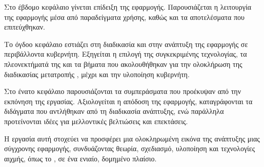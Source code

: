 Στο έβδομο κεφάλαιο γίνεται επίδειξη της εφαρμογής. Παρουσιάζεται η λειτουργία της εφαρμογής μέσα από παραδείγματα χρήσης, καθώς και τα αποτελέσματα που επιτεύχθηκαν. 

Το όγδοο κεφάλαιο εστιάζει στη διαδικασία  και στην ανάπτυξη της εφαρμογής σε περιβάλλοντα κυβερνήτη. Εξηγείται η επιλογή της συγκεκριμένης τεχνολογίας, τα πλεονεκτήματά της και τα βήματα που ακολουθήθηκαν για την ολοκλήρωση της διαδικασίας μετατροπής , μέχρι και την υλοποίηση κυβερνήτη.

Στο ένατο κεφάλαιο παρουσιάζονται τα συμπεράσματα που προέκυψαν από την εκπόνηση της εργασίας. Αξιολογείται η απόδοση της εφαρμογής, καταγράφονται τα διδάγματα που αντλήθηκαν από τη διαδικασία ανάπτυξης, ενώ παράλληλα προτείνονται ιδέες για μελλοντικές βελτιώσεις και επεκτάσεις.

Η εργασία αυτή στοχεύει να προσφέρει μια ολοκληρωμένη εικόνα της ανάπτυξης μιας σύγχρονης εφαρμογής, συνδυάζοντας θεωρία, σχεδιασμό, υλοποίηση και τεχνολογίες αιχμής, όπως το , σε ένα ενιαίο, δομημένο πλαίσιο.




